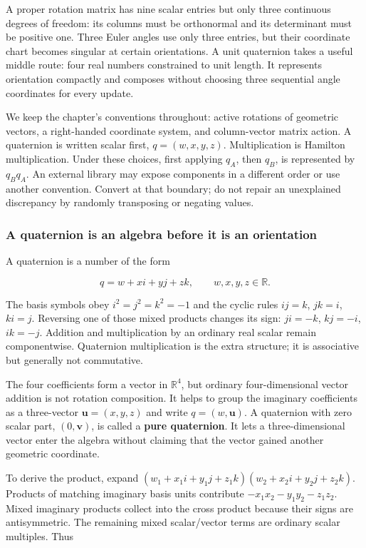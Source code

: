 A proper rotation matrix has nine scalar entries but only three continuous degrees of freedom: its columns must be orthonormal and its determinant must be positive one. Three Euler angles use only three entries, but their coordinate chart becomes singular at certain orientations. A unit quaternion takes a useful middle route: four real numbers constrained to unit length. It represents orientation compactly and composes without choosing three sequential angle coordinates for every update.

We keep the chapter's conventions throughout: active rotations of geometric vectors, a right-handed coordinate system, and column-vector matrix action. A quaternion is written scalar first, \(q=(w,x,y,z)\). Multiplication is Hamilton multiplication. Under these choices, first applying \(q_A\), then \(q_B\), is represented by \(q_Bq_A\). An external library may expose components in a different order or use another convention. Convert at that boundary; do not repair an unexplained discrepancy by randomly transposing or negating values.

\subsubsection{A quaternion is an algebra before it is an orientation}\label{a-quaternion-is-an-algebra-before-it-is-an-orientation}

A quaternion is a number of the form

\[
q=w+xi+yj+zk,
\qquad w,x,y,z\in\mathbb R.
\]

The basis symbols obey \(i^2=j^2=k^2=-1\) and the cyclic rules \(ij=k\), \(jk=i\), \(ki=j\). Reversing one of those mixed products changes its sign: \(ji=-k\), \(kj=-i\), \(ik=-j\). Addition and multiplication by an ordinary real scalar remain componentwise. Quaternion multiplication is the extra structure; it is associative but generally not commutative.

The four coefficients form a vector in \(\mathbb R^4\), but ordinary four-dimensional vector addition is not rotation composition. It helps to group the imaginary coefficients as a three-vector \(\mathbf u=(x,y,z)\) and write \(q=(w,\mathbf u)\). A quaternion with zero scalar part, \((0,\mathbf v)\), is called a \textbf{pure quaternion}. It lets a three-dimensional vector enter the algebra without claiming that the vector gained another geometric coordinate.

To derive the product, expand \((w_1+x_1i+y_1j+z_1k)(w_2+x_2i+y_2j+z_2k)\). Products of matching imaginary basis units contribute \(-x_1x_2-y_1y_2-z_1z_2\). Mixed imaginary products collect into the cross product because their signs are antisymmetric. The remaining mixed scalar/vector terms are ordinary scalar multiples. Thus

